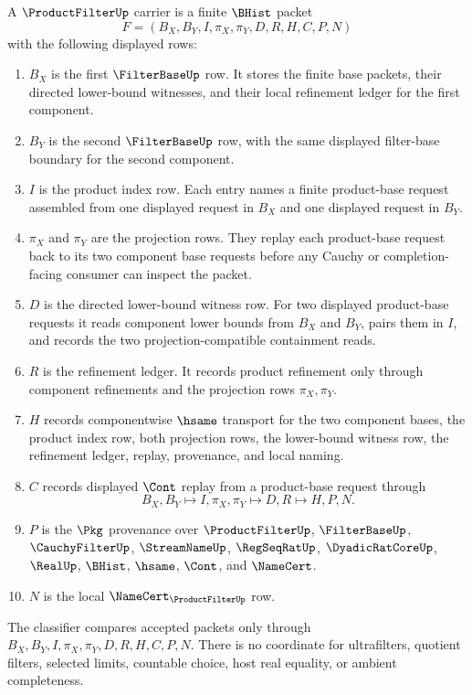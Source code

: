 \begin{definition}
\label{def:product-filter-carrier}
A $\ProductFilterUp$ carrier is a finite $\BHist$ packet
$$
F=(B_X,B_Y,I,\pi_X,\pi_Y,D,R,H,C,P,N)
$$
with the following displayed rows:
\begin{enumerate}
\item $B_X$ is the first $\FilterBaseUp$ row. It stores the finite base packets, their directed lower-bound witnesses, and their local refinement ledger for the first component.
\item $B_Y$ is the second $\FilterBaseUp$ row, with the same displayed filter-base boundary for the second component.
\item $I$ is the product index row. Each entry names a finite product-base request assembled from one displayed request in $B_X$ and one displayed request in $B_Y$.
\item $\pi_X$ and $\pi_Y$ are the projection rows. They replay each product-base request back to its two component base requests before any Cauchy or completion-facing consumer can inspect the packet.
\item $D$ is the directed lower-bound witness row. For two displayed product-base requests it reads component lower bounds from $B_X$ and $B_Y$, pairs them in $I$, and records the two projection-compatible containment reads.
\item $R$ is the refinement ledger. It records product refinement only through component refinements and the projection rows $\pi_X,\pi_Y$.
\item $H$ records componentwise $\hsame$ transport for the two component bases, the product index row, both projection rows, the lower-bound witness row, the refinement ledger, replay, provenance, and local naming.
\item $C$ records displayed $\Cont$ replay from a product-base request through
$$
B_X,B_Y \longmapsto I,\pi_X,\pi_Y \longmapsto D,R \longmapsto H,P,N .
$$
\item $P$ is the $\Pkg$ provenance over $\ProductFilterUp$, $\FilterBaseUp$, $\CauchyFilterUp$, $\StreamNameUp$, $\RegSeqRatUp$, $\DyadicRatCoreUp$, $\RealUp$, $\BHist$, $\hsame$, $\Cont$, and $\NameCert$.
\item $N$ is the local $\NameCert_{\ProductFilterUp}$ row.
\end{enumerate}
The classifier compares accepted packets only through $B_X,B_Y,I,\pi_X,\pi_Y,D,R,H,C,P,N$. There is no coordinate for ultrafilters, quotient filters, selected limits, countable choice, host real equality, or ambient completeness.
\end{definition}


